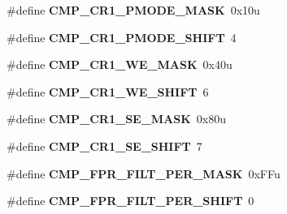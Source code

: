 \begin{DoxyCompactItemize}
\item 
\hypertarget{group___c_m_p___register___masks_ga09a2757123048a40e1694dd9454982ee}{}\#define {\bfseries C\+M\+P\+\_\+\+C\+R1\+\_\+\+P\+M\+O\+D\+E\+\_\+\+M\+A\+S\+K}~0x10u\label{group___c_m_p___register___masks_ga09a2757123048a40e1694dd9454982ee}

\item 
\hypertarget{group___c_m_p___register___masks_ga35cfe45cce5ed6925e522e3c4527054a}{}\#define {\bfseries C\+M\+P\+\_\+\+C\+R1\+\_\+\+P\+M\+O\+D\+E\+\_\+\+S\+H\+I\+F\+T}~4\label{group___c_m_p___register___masks_ga35cfe45cce5ed6925e522e3c4527054a}

\item 
\hypertarget{group___c_m_p___register___masks_ga70bc3069a7e105b59d01d83b4d1714b1}{}\#define {\bfseries C\+M\+P\+\_\+\+C\+R1\+\_\+\+W\+E\+\_\+\+M\+A\+S\+K}~0x40u\label{group___c_m_p___register___masks_ga70bc3069a7e105b59d01d83b4d1714b1}

\item 
\hypertarget{group___c_m_p___register___masks_ga386bf7ca4f7eb8faa4ba8346620667f2}{}\#define {\bfseries C\+M\+P\+\_\+\+C\+R1\+\_\+\+W\+E\+\_\+\+S\+H\+I\+F\+T}~6\label{group___c_m_p___register___masks_ga386bf7ca4f7eb8faa4ba8346620667f2}

\item 
\hypertarget{group___c_m_p___register___masks_ga899d139651dd67746e73452ff19e892b}{}\#define {\bfseries C\+M\+P\+\_\+\+C\+R1\+\_\+\+S\+E\+\_\+\+M\+A\+S\+K}~0x80u\label{group___c_m_p___register___masks_ga899d139651dd67746e73452ff19e892b}

\item 
\hypertarget{group___c_m_p___register___masks_ga57cd3f81d8844d4e0509f342ae5170bb}{}\#define {\bfseries C\+M\+P\+\_\+\+C\+R1\+\_\+\+S\+E\+\_\+\+S\+H\+I\+F\+T}~7\label{group___c_m_p___register___masks_ga57cd3f81d8844d4e0509f342ae5170bb}

\item 
\hypertarget{group___c_m_p___register___masks_gaf8ca758656c156ecadfbb6f9e57a3eef}{}\#define {\bfseries C\+M\+P\+\_\+\+F\+P\+R\+\_\+\+F\+I\+L\+T\+\_\+\+P\+E\+R\+\_\+\+M\+A\+S\+K}~0x\+F\+Fu\label{group___c_m_p___register___masks_gaf8ca758656c156ecadfbb6f9e57a3eef}

\item 
\hypertarget{group___c_m_p___register___masks_gaa563be7a82c0c1e3802e7ac7c920bf3a}{}\#define {\bfseries C\+M\+P\+\_\+\+F\+P\+R\+\_\+\+F\+I\+L\+T\+\_\+\+P\+E\+R\+\_\+\+S\+H\+I\+F\+T}~0\label{group___c_m_p___register___masks_gaa563be7a82c0c1e3802e7ac7c920bf3a}


\end{DoxyCompactItemize}
